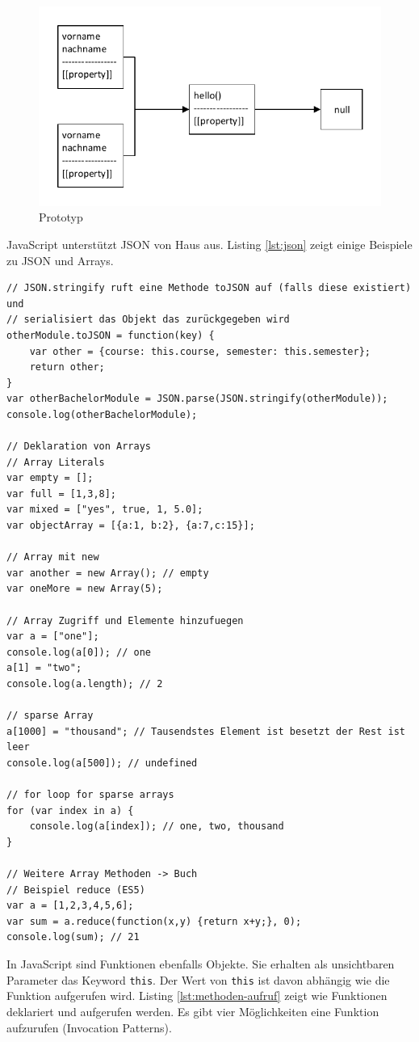 \begin{figure}
\centering
\includegraphics[width=0.7\linewidth]{fig/prototyp}
\caption{Prototyp}
\label{fig:prototyp}
\end{figure}

JavaScript unterstützt JSON von Haus aus. Listing \ref{lst:json} zeigt einige Beispiele zu JSON und Arrays.

\begin{lstlisting}[label=lst:json,caption=JSON]
// JSON.stringify ruft eine Methode toJSON auf (falls diese existiert) und 
// serialisiert das Objekt das zurückgegeben wird
otherModule.toJSON = function(key) {
	var other = {course: this.course, semester: this.semester};
	return other;
}
var otherBachelorModule = JSON.parse(JSON.stringify(otherModule));
console.log(otherBachelorModule);

// Deklaration von Arrays
// Array Literals
var empty = [];
var full = [1,3,8];
var mixed = ["yes", true, 1, 5.0];
var objectArray = [{a:1, b:2}, {a:7,c:15}];

// Array mit new
var another = new Array(); // empty
var oneMore = new Array(5);

// Array Zugriff und Elemente hinzufuegen
var a = ["one"];
console.log(a[0]); // one
a[1] = "two";
console.log(a.length); // 2

// sparse Array
a[1000] = "thousand"; // Tausendstes Element ist besetzt der Rest ist leer
console.log(a[500]); // undefined

// for loop for sparse arrays
for (var index in a) {
	console.log(a[index]); // one, two, thousand
}

// Weitere Array Methoden -> Buch
// Beispiel reduce (ES5)
var a = [1,2,3,4,5,6];
var sum = a.reduce(function(x,y) {return x+y;}, 0);
console.log(sum); // 21
\end{lstlisting}

In JavaScript sind Funktionen ebenfalls Objekte. Sie erhalten als unsichtbaren Parameter das Keyword \lstinline|this|. Der Wert von \lstinline|this| ist davon abhängig wie die Funktion aufgerufen wird. Listing \ref{lst:methoden-aufruf} zeigt wie Funktionen deklariert und aufgerufen werden. Es gibt vier Möglichkeiten eine Funktion aufzurufen (Invocation Patterns).

